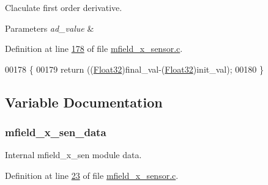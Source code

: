 Claculate first order derivative. 


\begin{DoxyParams}{Parameters}
{\em ad\+\_\+value} & \\
\hline
\end{DoxyParams}


Definition at line \hyperlink{a00050_source_l00178}{178} of file \hyperlink{a00050_source}{mfield\+\_\+x\+\_\+sensor.\+c}.


\begin{DoxyCode}
00178                                                                            \{
00179      \textcolor{keywordflow}{return} ((\hyperlink{a00072_a87d38f886e617ced2698fc55afa07637}{Float32})final\_val-(\hyperlink{a00072_a87d38f886e617ced2698fc55afa07637}{Float32})init\_val);
00180 \}
\end{DoxyCode}


\subsection{Variable Documentation}
\hypertarget{a00025_af8c531b1ba5fea148fb9111e06058f92}{
\subsubsection[{mfield\+\_\+x\+\_\+sen\+\_\+data}]{ mfield\+\_\+x\+\_\+sen\+\_\+data}}\label{a00025_af8c531b1ba5fea148fb9111e06058f92}


Internal mfield\+\_\+x\+\_\+sen module data. 



Definition at line \hyperlink{a00050_source_l00023}{23} of file \hyperlink{a00050_source}{mfield\+\_\+x\+\_\+sensor.\+c}.

